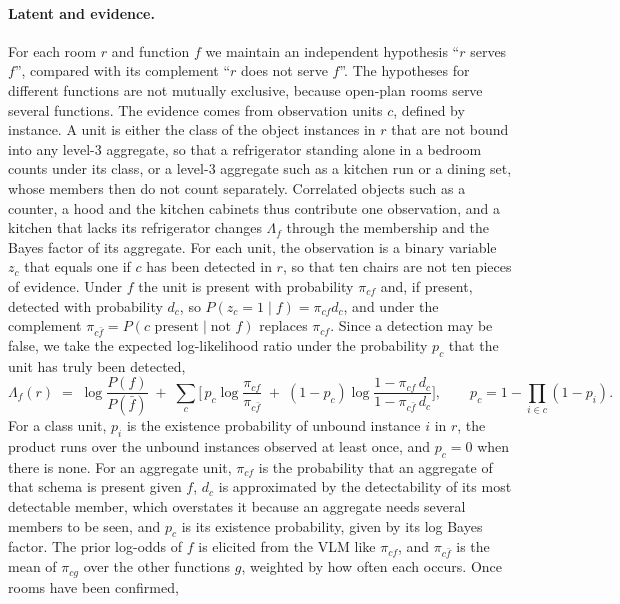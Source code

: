 \paragraph{Latent and evidence.}
For each room $r$ and function $f$ we maintain an independent hypothesis ``$r$ serves $f$'', compared with its
complement ``$r$ does not serve $f$''. The hypotheses for different functions are not mutually exclusive, because
open-plan rooms serve several functions. The evidence comes from observation units $c$, defined by instance. A unit is either the
class of the object instances in $r$ that are not bound into any level-3 aggregate, so that a refrigerator standing
alone in a bedroom counts under its class, or a level-3 aggregate such as a kitchen run or a dining set, whose members
then do not count separately. Correlated objects such as a counter, a hood and the kitchen cabinets thus contribute one
observation, and a kitchen that lacks its refrigerator changes $\Lambda_f$ through the membership and the Bayes
factor of its aggregate. For each unit, the observation is a binary variable $z_c$ that equals one if $c$ has been
detected in $r$, so that ten chairs are not ten pieces of evidence. Under $f$ the unit is present with probability
$\pi_{cf}$ and, if present, detected with probability $d_c$, so $P(z_c = 1 \mid f) = \pi_{cf} d_c$, and under the
complement $\pi_{c\bar f} = P(c \text{ present} \mid \text{not } f)$ replaces $\pi_{cf}$. Since a detection may be
false, we take the expected log-likelihood ratio under the probability $p_c$ that the unit has truly been detected,
\begin{equation}
    \Lambda_f(r) \;=\; \log\frac{P(f)}{P(\bar f)} \;+\; \sum_c \Big[\, p_c \log\frac{\pi_{cf}}{\pi_{c\bar f}}
    \;+\; (1 - p_c)\log\frac{1 - \pi_{cf}\, d_c}{1 - \pi_{c\bar f}\, d_c} \Big],
    \qquad p_c = 1 - \prod_{i \in c} (1 - p_i).
    \label{eq:lh_function_evidence}
\end{equation}
For a class unit, $p_i$ is the existence probability of unbound instance $i$ in $r$, the product runs over the
unbound instances observed at least once, and $p_c = 0$ when there is none. For an aggregate unit, $\pi_{cf}$ is the
probability that an aggregate of that schema is present given $f$, $d_c$ is approximated by the detectability of its most
detectable member, which overstates it because an aggregate needs several members to be seen, and $p_c$ is its existence probability, given by its log Bayes factor. The prior log-odds of $f$ is elicited from the VLM like
$\pi_{cf}$, and $\pi_{c\bar f}$ is the mean of $\pi_{cg}$ over the other functions $g$, weighted by how often each occurs. Once rooms have been confirmed,
